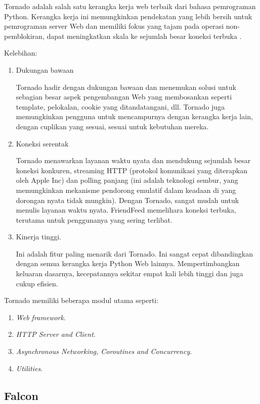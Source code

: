 Tornado adalah salah satu kerangka kerja web terbaik dari bahasa pemrograman Python. Kerangka kerja ini memungkinkan pendekatan yang lebih bersih untuk pemrograman server Web dan memiliki fokus yang tajam pada operasi non-pemblokiran, dapat meningkatkan skala ke sejumlah besar koneksi terbuka \cite{panjaitan2018sistem}.

Kelebihan:
\begin{enumerate}
\item Dukungan bawaan

Tornado hadir dengan dukungan bawaan dan menemukan solusi untuk sebagian besar aspek pengembangan Web yang membosankan seperti template, pelokalan, cookie yang ditandatangani, dll. Tornado juga memungkinkan pengguna untuk mencampurnya dengan kerangka kerja lain, dengan cuplikan yang sesuai, sesuai untuk kebutuhan mereka.

\item Koneksi serentak

Tornado menawarkan layanan waktu nyata dan mendukung sejumlah besar koneksi konkuren, streaming HTTP (protokol komunikasi yang diterapkan oleh Apple Inc) dan polling panjang (ini adalah teknologi sembur, yang memungkinkan mekanisme pendorong emulatif dalam keadaan di yang dorongan nyata tidak mungkin). Dengan Tornado, sangat mudah untuk menulis layanan waktu nyata. FriendFeed memelihara koneksi terbuka, terutama untuk penggunanya yang sering terlibat.

\item Kinerja tinggi.

Ini adalah fitur paling menarik dari Tornado. Ini sangat cepat dibandingkan dengan semua kerangka kerja Python Web lainnya. Mempertimbangkan keluaran dasarnya, kecepatannya sekitar empat kali lebih tinggi dan juga cukup efisien.
\end{enumerate}

Tornado memiliki beberapa modul utama seperti:
\begin{enumerate}
\item \textit{Web framework}.
\item \textit{HTTP Server and Client}.
\item \textit{Asynchronous Networking, Coroutines and Concurrency}.
\item \textit{Utilities}.
\end{enumerate}

\subsection{Falcon}

